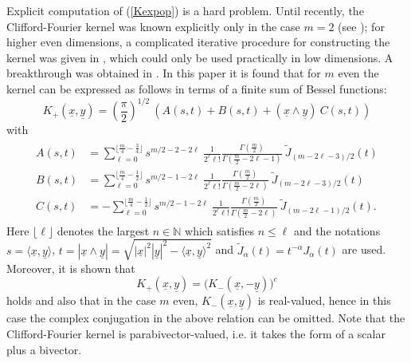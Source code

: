\documentclass{amsart}
\theoremstyle{remark}
\begin{document}
Explicit computation of (\ref{Kexpop}) is a hard problem. Until recently, the Clifford-Fourier kernel was known explicitly only in the case $m=2$ (see \cite{MR2283868}); for higher even dimensions, a complicated iterative procedure for constructing the kernel was given in \cite{JFAA-Fourier-Bessel}, which could only be used practically in low dimensions. A breakthrough was obtained in \cite{DBXu}. In this paper it is found that for $m$ even the kernel can be expressed as follows in terms of a finite sum of Bessel functions:
\begin{equation}\label{kernel C-F}
K_{+}({\underline{x}},{\underline{y}}) =  \left( \frac{\pi}{2} \right)^{1/2} \ \left( A(s,t) + B(s,t) + ({\underline{x}} \wedge {\underline{y}}) \ C(s,t) \right)
\end{equation}
with
\begin{align}
\label{CFeven}
\begin{split}
A(s,t) &=  \sum_{\ell=0}^{\lfloor \frac{m}{4}-\frac{3}{4} \rfloor} s^{m/2-2-2 \ell} \ \frac{1}{2^{\ell} \ell!} \frac{\Gamma \left( \frac{m}{2} \right)}{\Gamma \left( \frac{m}{2}-2 \ell -1 \right)} \ \widetilde{J}_{(m-2\ell-3)/2}(t)\\
B(s,t) &=   \sum_{\ell=0}^{\lfloor \frac{m}{4}-\frac{1}{2} \rfloor} s^{m/2-1-2 \ell} \ \frac{1}{2^{\ell} \ell!} \frac{\Gamma \left( \frac{m}{2} \right)}{\Gamma \left( \frac{m}{2}-2 \ell  \right)} \ \widetilde{J}_{(m-2\ell-3)/2}(t)\\
C(s,t) &=  - \sum_{\ell=0}^{\lfloor \frac{m}{4}-\frac{1}{2} \rfloor} s^{m/2-1-2 \ell} \ \frac{1}{2^{\ell} \ell!} \frac{\Gamma \left( \frac{m}{2} \right)}{\Gamma \left( \frac{m}{2}-2 \ell \right)} \ \widetilde{J}_{(m-2\ell-1)/2}(t).
\end{split}
\end{align}
Here $\lfloor \ell \rfloor$ denotes the largest $n \in \mathbb{N}$ which satisfies $n \leq \ell$ and the notations $s= \langle {\underline{x}},{\underline{y}} \rangle$, $t=| {\underline{x}} \wedge {\underline{y}}|= \sqrt{|{\underline{x}}|^{2} |{\underline{y}}|^{2}-\langle {\underline{x}}, {\underline{y}} \rangle^2}$ and $\widetilde{J}_{\alpha}(t) = t^{-\alpha} J_{\alpha}(t)$ are used. Moreover, it is shown that
\begin{equation}\label{rel C-F kernel}
K_+({\underline{x}},{\underline{y}}) = \bigl( K_{-}({\underline{x}},-{\underline{y}}) \bigr)^c
\end{equation}
holds and also that in the case $m$ even, $K_{-}({\underline{x}},{\underline{y}})$ is real-valued, hence in this case the complex conjugation in the above relation can be omitted. Note that the Clifford-Fourier kernel is parabivector-valued, i.e. it takes the form of a scalar plus a bivector.
\end{document}
